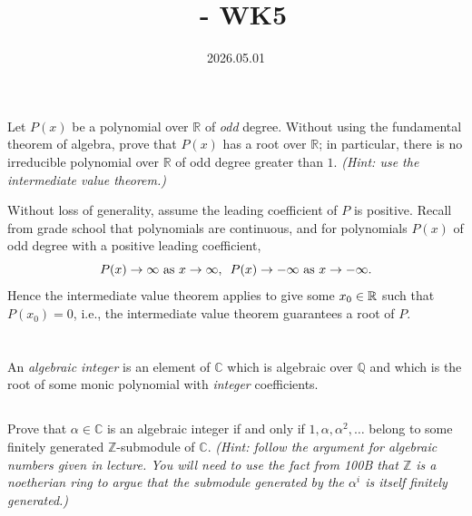 \documentclass[12pt]{article}
\title{\course\ - WK5}
\author{\myname}
\date{2026.05.01}
\begin{document}
\maketitle
\thispagestyle{fancy}



\section{} 
Let $P(x)$ be a polynomial over $\mathbb{R}$ of \emph{odd} degree. 
Without using the fundamental theorem of algebra, prove that $P(x)$ has a root over $\mathbb{R}$; 
in particular, there is no irreducible polynomial over $\mathbb{R}$ of odd degree greater than $1$.
\emph{(Hint: use the intermediate value theorem.)}

\noindent\dotfill

Without loss of generality, assume the leading coefficient of $P$ is positive. 
Recall from grade school that polynomials are continuous, and for polynomials $P(x)$ of odd degree with a positive leading coefficient,
$$P(x) \rightarrow \infty \text{ as } x \rightarrow \infty, \hspace{0.5em} P(x) \rightarrow -\infty \text{ as } x \rightarrow -\infty.$$
Hence the intermediate value theorem applies to give some $x_0 \in \mathbb{R}$ such that $P(x_0) = 0$,
i.e., the intermediate value theorem guarantees a root of $P$. 
 
\section{} 
An \emph{algebraic integer} is an element of $\mathbb{C}$ which is algebraic over $\mathbb{Q}$ and which is the root of some monic polynomial with \emph{integer} coefficients.
\subsection{}
Prove that $\alpha \in \mathbb{C}$ is an algebraic integer if and only if $1, \alpha, \alpha^2, \dots$ belong to some finitely generated $\mathbb{Z}$-submodule of $\mathbb{C}$.
\emph{(Hint: follow the argument for algebraic numbers given in lecture. 
You will need to use the fact from 100B that $\mathbb{Z}$ is a \emph{noetherian ring} to argue that the submodule generated by the $\alpha^i$ is itself finitely generated.)}

\noindent\dotfill 
\end{document}
